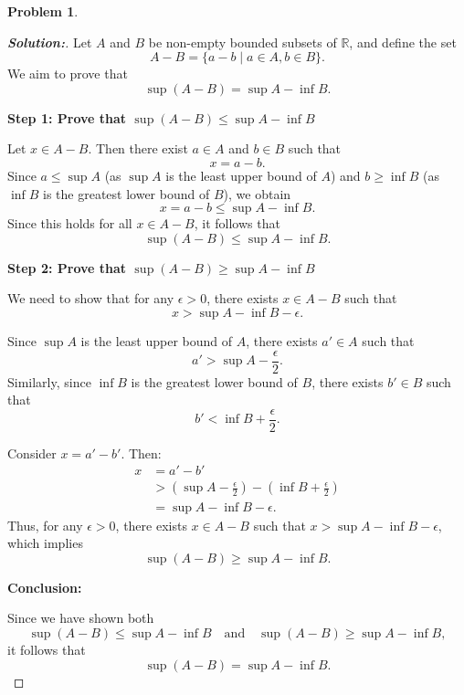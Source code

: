 \documentclass[12pt]{article}
\theoremstyle{definition}\newtheorem{problem}{Problem}
\newenvironment{solution}{\begin{proof}[\bfseries\textup{Solution:}]}{\end{proof}}
\begin{document}
\newpage
\begin{problem}
\end{problem}
\begin{solution}

    
Let \( A \) and \( B \) be non-empty bounded subsets of \( \mathbb{R} \), and define the set
\[
A - B = \{ a - b \mid a \in A, b \in B \}.
\]
We aim to prove that
\[
\sup (A - B) = \sup A - \inf B.
\]

\textbf{Step 1: Prove that \( \sup (A - B) \leq \sup A - \inf B \)}

Let \( x \in A - B \). Then there exist \( a \in A \) and \( b \in B \) such that
\[
x = a - b.
\]
Since \( a \leq \sup A \) (as \( \sup A \) is the least upper bound of \( A \)) and \( b \geq \inf B \) (as \( \inf B \) is the greatest lower bound of \( B \)), we obtain
\[
x = a - b \leq \sup A - \inf B.
\]
Since this holds for all \( x \in A - B \), it follows that
\[
\sup (A - B) \leq \sup A - \inf B.
\]

\textbf{Step 2: Prove that \( \sup (A - B) \geq \sup A - \inf B \)}

We need to show that for any \( \epsilon > 0 \), there exists \( x \in A - B \) such that
\[
x > \sup A - \inf B - \epsilon.
\]

Since \( \sup A \) is the least upper bound of \( A \), there exists \( a' \in A \) such that
\[
a' > \sup A - \frac{\epsilon}{2}.
\]
Similarly, since \( \inf B \) is the greatest lower bound of \( B \), there exists \( b' \in B \) such that
\[
b' < \inf B + \frac{\epsilon}{2}.
\]

Consider \( x = a' - b' \). Then:
\[
\begin{aligned}
x &= a' - b' \\
&> \left( \sup A - \frac{\epsilon}{2} \right) - \left( \inf B + \frac{\epsilon}{2} \right) \\
&= \sup A - \inf B - \epsilon.
\end{aligned}
\]
Thus, for any \( \epsilon > 0 \), there exists \( x \in A - B \) such that \( x > \sup A - \inf B - \epsilon \), which implies
\[
\sup (A - B) \geq \sup A - \inf B.
\]

\textbf{Conclusion:}

Since we have shown both
\[
\sup (A - B) \leq \sup A - \inf B \quad \text{and} \quad \sup (A - B) \geq \sup A - \inf B,
\]
it follows that
\[
\sup (A - B) = \sup A - \inf B.
\]
\end{solution}
\end{document}
